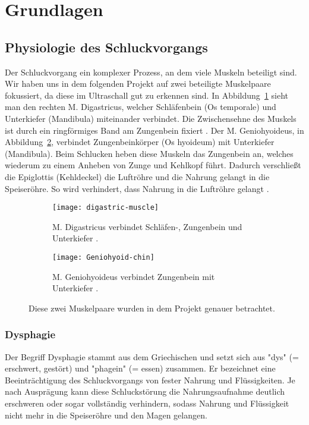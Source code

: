 \documentclass[
	german,
	accentcolor=10c,%
	type=intern,
	marginpar=false
	]{tudapub}
\begin{document}
\section{Grundlagen}

\subsection{Physiologie des Schluckvorgangs}
Der Schluckvorgang ein komplexer Prozess, an dem viele Muskeln beteiligt sind. Wir haben uns in dem folgenden Projekt auf zwei beteiligte Muskelpaare fokussiert, da diese im Ultraschall gut zu erkennen sind. In Abbildung~\ref{fig:digastric-muscle} sieht man den rechten M. Digastricus, welcher Schläfenbein (Os temporale) und Unterkiefer (Mandibula) miteinander verbindet. Die Zwischensehne des Muskels ist durch ein ringförmiges Band am Zungenbein fixiert \cite{digastricus_explain}. 
Der M. Geniohyoideus, in Abbildung~\ref{fig:Geniohyoid-chin}, verbindet Zungenbeinkörper (Os hyoideum) mit Unterkiefer (Mandibula). Beim Schlucken heben diese Muskeln das Zungenbein an, welches wiederum zu einem Anheben von Zunge und Kehlkopf führt. Dadurch verschließt die Epiglottis (Kehldeckel) die Luftröhre und die Nahrung gelangt in die Speiseröhre.  
So wird verhindert, dass Nahrung in die Luftröhre gelangt \cite{geniohyoideus_explain,digastricus_explain}.

\begin{figure}[h]
    \centering
    \begin{subfigure}[b]{0.3\textwidth}
        \texttt{[image: digastric-muscle]}
        \caption{M. Digastricus verbindet Schläfen-, Zungenbein und Unterkiefer \cite{digastricus}.}
        \label{fig:digastric-muscle}
    \end{subfigure}
    \hfill
    \begin{subfigure}[b]{0.3\textwidth}
        \texttt{[image: Geniohyoid-chin]}
        \caption{M. Geniohyoideus verbindet Zungenbein mit Unterkiefer \cite{geniohyoideus}.}
        \label{fig:Geniohyoid-chin}
    \end{subfigure}
    \caption{Diese zwei Muskelpaare wurden in dem Projekt genauer betrachtet.}
    \label{fig:muskeln}
\end{figure}

\subsubsection{Dysphagie}
Der Begriff Dysphagie stammt aus dem Griechischen und setzt sich aus "dys" (= erschwert, gestört) und "phagein" (= essen) zusammen. Er bezeichnet eine Beeinträchtigung des Schluckvorgangs von fester Nahrung und Flüssigkeiten. Je nach Ausprägung kann diese Schluckstörung die Nahrungsaufnahme deutlich erschweren oder sogar vollständig verhindern, sodass Nahrung und Flüssigkeit nicht mehr in die Speiseröhre und den Magen gelangen.
\end{document}
